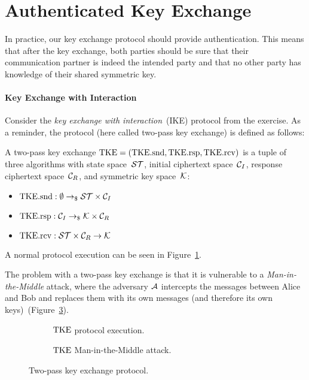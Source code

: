 \section{Authenticated Key Exchange}
\label{sec:AKE}

In practice, our key exchange protocol should provide authentication.
This means that after the key exchange, both parties should be sure that their communication partner is indeed the intended party and that no other party has knowledge of their shared symmetric key.

\paragraph{Key Exchange with Interaction} Consider the \emph{key exchange with interaction}~(IKE) protocol from the exercise. 
As a reminder, the protocol (here called two-pass key exchange) is defined as follows:

A two-pass key exchange $\mathrm{TKE}=(\mathrm{TKE}.\mathrm{snd},\mathrm{TKE}.\mathrm{rsp},\mathrm{TKE}.\mathrm{rcv})$ is a tuple of three algorithms with state space~$\mathcal{ST}$, initial ciphertext space~$\mathcal{C}_I$, response ciphertext space~$\mathcal{C}_R$, and symmetric key space~$\mathcal{K}$:

\begin{itemize}
    \item $\mathrm{TKE}.\mathrm{snd}: \emptyset \to_\$ \mathcal{ST}\times\mathcal{C}_I$
    \item $\mathrm{TKE}.\mathrm{rsp}: \mathcal{C}_I \to_\$ \mathcal{K}\times\mathcal{C}_R$
    \item $\mathrm{TKE}.\mathrm{rcv}: \mathcal{ST}\times\mathcal{C}_R \to \mathcal{K}$
\end{itemize}

A normal protocol execution can be seen in Figure~\ref{fig:tke:overview}.

The problem with a two-pass key exchange is that it is vulnerable to a \emph{Man-in-the-Middle} attack, where the adversary $\mathcal{A}$ intercepts the messages between Alice and Bob and replaces them with its own messages (and therefore its own keys)~(Figure~\ref{fig:tke:MitM}).

\begin{figure}[!ht]
    \centering
    \begin{subfigure}{.49\textwidth}
        \centering
        
        \caption{$\mathrm{TKE}$ protocol execution.}
        \label{fig:tke:overview}
    \end{subfigure}\hfill
    \begin{subfigure}{.49\textwidth}
        \centering
        
        \caption{$\mathrm{TKE}$ Man-in-the-Middle attack.}
        \label{fig:tke:MitM}
    \end{subfigure}
    \caption{Two-pass key exchange protocol.}
\end{figure}

